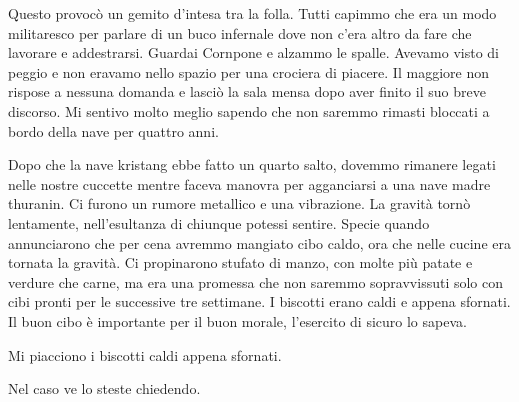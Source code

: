 Questo provocò un gemito d'intesa tra la folla. Tutti capimmo che era un
modo militaresco per parlare di un buco infernale dove non c'era altro
da fare che lavorare e addestrarsi. Guardai Cornpone e alzammo le
spalle. Avevamo visto di peggio e non eravamo nello spazio per una
crociera di piacere. Il maggiore non rispose a nessuna domanda e lasciò
la sala mensa dopo aver finito il suo breve discorso. Mi sentivo molto
meglio sapendo che non saremmo rimasti bloccati a bordo della nave per
quattro anni.

\hfill\break

Dopo che la nave kristang ebbe fatto un quarto salto, dovemmo rimanere
legati nelle nostre cuccette mentre faceva manovra per agganciarsi a una
nave madre thuranin. Ci furono un rumore metallico e una vibrazione. La
gravità tornò lentamente, nell'esultanza di chiunque potessi sentire.
Specie quando annunciarono che per cena avremmo mangiato cibo caldo, ora
che nelle cucine era tornata la gravità. Ci propinarono stufato di
manzo, con molte più patate e verdure che carne, ma era una promessa che
non saremmo sopravvissuti solo con cibi pronti per le successive tre
settimane. I biscotti erano caldi e appena sfornati. Il buon cibo è
importante per il buon morale, l'esercito di sicuro lo sapeva.

Mi piacciono i biscotti caldi appena sfornati.

Nel caso ve lo steste chiedendo.

